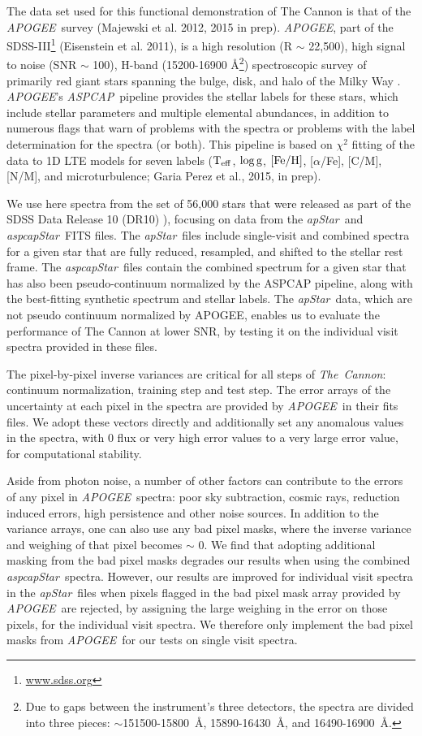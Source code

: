 \documentclass[12pt, preprint]{aastex}
\newcommand{\tc}{\textsl{The~Cannon}}
\newcommand{\apogee}{\textsl{APOGEE}}
\newcommand{\aspcap}{\textsl{ASPCAP}}
\newcommand{\aspcapstar}{\textsl{aspcapStar}}
\newcommand{\apstar}{\textsl{apStar}}
\newcommand{\teff}{\mbox{$\rm T_{eff}$}}
\newcommand{\feh}{\mbox{$\rm [Fe/H]$}}
\newcommand{\logg}{\mbox{$\rm \log g$}}
\begin{document}
The data set used for this functional demonstration of The Cannon is that of the \apogee\ survey (Majewski et al. 2012, 2015 in prep).  \apogee, part of the SDSS-III\footnote{\url{www.sdss.org}} (Eisenstein et al. 2011), is a high resolution (R $\sim$ 22,500), high signal to noise (SNR $\sim$ 100), H-band (15200-16900 \AA\footnote{Due to gaps between the instrument's three detectors, the spectra are divided into three pieces: $\sim$151500-15800~\AA, 15890-16430~\AA, and 16490-16900~\AA.}) spectroscopic survey of primarily red giant stars spanning the bulge, disk, and halo of the Milky Way \citep{GZ2013}.  \apogee 's \aspcap\ pipeline provides the stellar labels for these stars, which include stellar parameters and multiple elemental abundances, in addition to numerous flags that warn of problems with the spectra or problems with the label determination for the spectra (or both).  This pipeline is based on $\chi^2$ fitting of the data to 1D LTE models for seven labels (\teff, \logg, \feh, [$\alpha$/Fe], [C/M], [N/M], and microturbulence; Garia Perez et al., 2015, in prep). 

We use here spectra from the set of 56,000 stars that were released as part of the SDSS Data Release 10 (DR10) \citep{Ahn2014}), focusing on data from the \apstar\ and  \aspcapstar\ FITS files.  The \apstar\ files include single-visit and combined spectra for a given star that are fully reduced, resampled, and shifted to the stellar rest frame.  The \aspcapstar\ files contain the combined spectrum for a given star that has also been pseudo-continuum normalized by the ASPCAP pipeline, along with the best-fitting synthetic spectrum and stellar labels.  The \apstar\ data, which are not pseudo continuum normalized by APOGEE, enables us to evaluate the performance of The Cannon at lower SNR, by testing it on the individual visit spectra provided in these files.

The pixel-by-pixel inverse variances are critical for all steps of \tc: continuum normalization, training step and test step. The error arrays of the uncertainty at each pixel in the spectra are provided by \apogee\ in their fits files. We adopt these vectors directly and additionally set any anomalous values in the spectra, with 0 flux or very high error values to a very large error value, for computational stability.  

Aside from photon noise, a number of other factors can contribute to the errors of any pixel in \apogee\ spectra: poor sky subtraction, cosmic rays, reduction induced errors, high persistence and other noise sources. In addition to the variance arrays, one can also use any bad pixel masks, where the
inverse variance and weighing of that pixel becomes $\sim$ 0. We find that adopting additional masking from the bad pixel masks degrades our results when using the combined \aspcapstar\ spectra. However, our results are improved for individual visit spectra in the \apstar\ files when pixels flagged in the bad pixel mask array provided by \apogee\ are rejected, by assigning the large weighing in the error on those pixels, for the individual visit spectra. We therefore only implement the bad pixel masks from \apogee\ for our tests on single visit spectra. 
\end{document}
